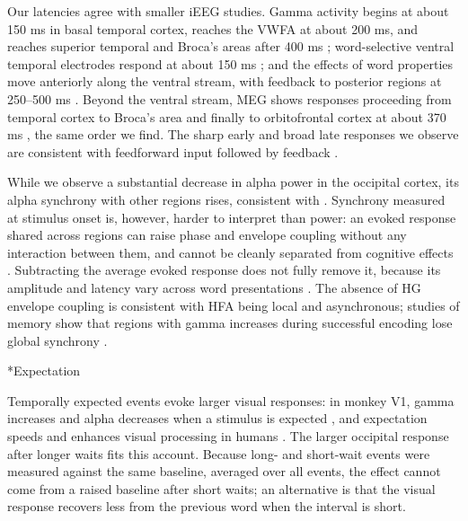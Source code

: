 \documentclass[10pt,twocolumn]{article}  %
\makeatletter
\renewcommand\subsection{\@startsection{subsection}{2}{\z@}{-8pt plus -2pt minus -1pt}{2pt}{\raggedright\sffamily\bfseries\normalsize}}
\makeatother
\begin{document}
Our latencies agree with smaller iEEG studies. Gamma activity begins at about 150 ms in basal temporal cortex, reaches the VWFA at about 200 ms, and reaches superior temporal and Broca's areas after 400 ms \citep{Mainy_2007}; word-selective ventral temporal electrodes respond at about 150 ms \citep{Kadipasaoglu_2016}; and the effects of word properties move anteriorly along the ventral stream, with feedback to posterior regions at 250--500 ms \citep{Woolnough_2020}. Beyond the ventral stream, MEG shows responses proceeding from temporal cortex to Broca's area and finally to orbitofrontal cortex at about 370 ms \citep{Halgren_2002}, the same order we find. The sharp early and broad late responses we observe are consistent with feedforward input followed by feedback \citep{Halgren_2006,Ghuman_2014}.

While we observe a substantial decrease in alpha power in the occipital cortex, its alpha synchrony with other regions rises, consistent with \citep{Hanslmayr_2016}. Synchrony measured at stimulus onset is, however, harder to interpret than power: an evoked response shared across regions can raise phase and envelope coupling without any interaction between them, and cannot be cleanly separated from cognitive effects \citealp{David_2006,Shah_2004}. Subtracting the average evoked response does not fully remove it, because its amplitude and latency vary across word presentations \citep{Truccolo_2002,David_2006}. The absence of HG envelope coupling is consistent with HFA being local and asynchronous; studies of memory show that regions with gamma increases during successful encoding lose global synchrony \citep{Burke_2013}. 

\subsection*{Expectation}\label{disc-expectation}

Temporally expected events evoke larger visual responses: in monkey V1, gamma increases and alpha decreases when a stimulus is expected \citep{Lima_2011}, and expectation speeds and enhances visual processing in humans \citep{Doherty_2005}. The larger occipital response after longer waits fits this account. Because long- and short-wait events were measured against the same baseline, averaged over all events, the effect cannot come from a raised baseline after short waits; an alternative is that the visual response recovers less from the previous word when the interval is short.
\end{document}
